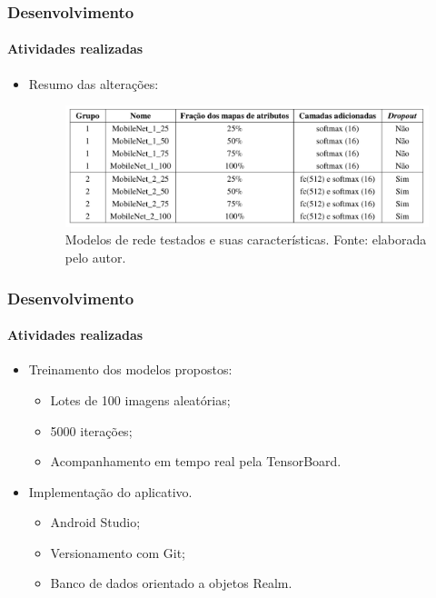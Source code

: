 \documentclass{beamer}
\begin{document}
    \begin{frame}[t]
      \frametitle{Desenvolvimento}
      \framesubtitle{Atividades realizadas}      
      \begin{itemize}
        \item<1-> Resumo das alterações: \medskip
        \begin{figure}[hbt]
      		 	\begin{center}
      				\includegraphics[height=.3 \textwidth]{img/models_table.png}
      			\end{center}
      			\caption{Modelos de rede testados e suas características. Fonte: elaborada pelo autor.}
      		\end{figure}
      \end{itemize}
    \end{frame}
    
    \begin{frame}[t]
      \frametitle{Desenvolvimento}
      \framesubtitle{Atividades realizadas}      
      \begin{itemize}
        \item<1-> Treinamento dos modelos propostos: \medskip
		 \begin{itemize}
        		\item<1-> Lotes de 100 imagens aleatórias; \medskip
        		\item<1-> 5000 iterações; \medskip
        		\item<1-> Acompanhamento em tempo real pela TensorBoard. \medskip
		\end{itemize}        
        \item<2-> Implementação do aplicativo.\medskip
        \begin{itemize}
        		\item<2-> Android Studio;\medskip
        		\item<2-> Versionamento com Git;\medskip
        		\item<2-> Banco de dados orientado a objetos Realm.\medskip
        \end{itemize}
      \end{itemize}
    \end{frame}
        
\end{document}
